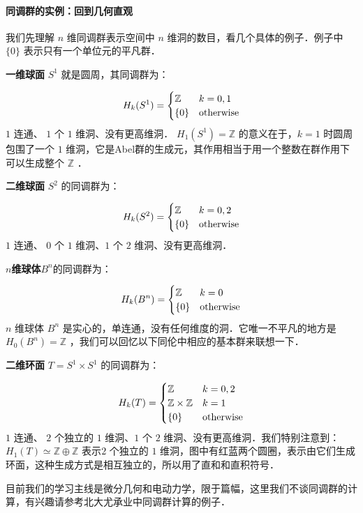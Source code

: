         \paragraph{同调群的实例：回到几何直观}
            我们先理解 $n$ 维同调群表示空间中 $n$ 维洞的数目，看几个具体的例子．例子中 $\{0\}$ 表示只有一个单位元的平凡群．\par

            \textbf{一维球面} $S^1$ 就是圆周，其同调群为：\par
            $$
                H_k(S^1)={\begin{cases}\mathbb{Z} & k=0,1\\ \{0\} &{\text{otherwise}}\end{cases}} \\
            $$
            $1$ 连通、 $1$ 个 $1$ 维洞、没有更高维洞． $H_1(S^1) = \mathbb{Z}$ 的意义在于，$k=1$ 时圆周包围了一个 $1$ 维洞，它是Abel群的生成元，其作用相当于用一个整数在群作用下可以生成整个 $\mathbb{Z}$ ．\par
            \textbf{二维球面} $S^2$ 的同调群为：\par
            $$
                H_k(S^2)={\begin{cases}\mathbb{Z} & k=0,2\\ \{0\} &{\text{otherwise}}\end{cases}} \\
            $$
            $1$ 连通、 $0$ 个 $1$ 维洞、$1$ 个 $2$ 维洞、没有更高维洞．\par
            $n$\textbf{维球体}$B^n$的同调群为：\par
            $$
                H_k(B^n)={\begin{cases}\mathbb{Z} & k=0\\ \{0\} &{\text{otherwise}}\end{cases}} \\
            $$
            $n$ 维球体 $B^n$ 是实心的，单连通，没有任何维度的洞．它唯一不平凡的地方是 $H_0(B^n) = \mathbb{Z}$ ，我们可以回忆以下同伦中相应的基本群来联想一下．\par
            \textbf{二维环面} $T=S^1 \times S^1$ 的同调群为：\par
            $$
                H_{k}(T)={\begin{cases}\mathbb {Z} &k=0,2\\\mathbb {Z} \times \mathbb {Z} &k=1\\\{0\}&{\text{otherwise}}\end{cases}} \\
            $$
            $1$ 连通、 $2$ 个独立的 $1$ 维洞、$1$ 个 $2$ 维洞、没有更高维洞．我们特别注意到：$H_1(T) \simeq \mathbb{Z} \oplus \mathbb{Z}$ 表示$2$ 个独立的 $1$ 维洞，图中有红蓝两个圆圈，表示由它们生成环面，这种生成方式是相互独立的，所以用了直和和直积符号．\par
            目前我们的学习主线是微分几何和电动力学，限于篇幅，这里我们不谈同调群的计算，有兴趣请参考北大尤承业中同调群计算的例子．\par


